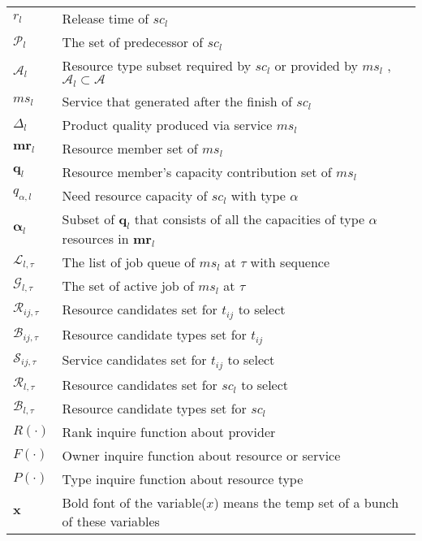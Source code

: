 \begin{table}[htbp]
\begin{tabularx}{\textwidth}{|lX|}
	$r_l$ & Release time of $sc_l$\\
	$\mathcal{P}_{l}$ & The set of predecessor of $sc_{l}$\\
	$\mathcal{A}_l$ & Resource type subset required by $sc_l$ or provided by $ms_l$ , $\mathcal{A}_l\subset\mathcal{A}$\\
	$ms_l$ & Service that generated after the finish of $sc_l$\\
	$\Delta_l$ & Product quality produced via service $ms_l$\\
	$\bm{mr}_l$ & Resource member set of $ms_l$\\
	$\bm{q}_l$ & Resource member's capacity contribution set of $ms_l$\\
	$q_{\alpha,l}$ & Need resource capacity of $sc_l$ with type $\alpha$\\
	$\bm{\alpha}_l$ & Subset of $\bm{q}_l$ that consists of all the capacities of type $\alpha$ resources in $\bm{mr}_l$\\
	$\mathcal{L}_{l,\tau}$ & The list of job queue of $ms_l$ at $\tau$ with sequence\\
	$\mathcal{G}_{l,\tau}$ & The set of active job of $ms_l$ at $\tau$ \\
	$\mathcal{R}_{ij,\tau}$ & Resource candidates set for $t_{ij}$ to select\\
	$\mathcal{B}_{ij,\tau}$ & Resource candidate types set for $t_{ij}$\\
	$\mathcal{S}_{ij,\tau}$ & Service candidates set for $t_{ij}$ to select\\
	$\mathcal{R}_{l,\tau}$ & Resource candidates set for $sc_l$ to select\\
	$\mathcal{B}_{l,\tau}$ & Resource candidate types set for $sc_l$\\
	$R(\cdot)$ & Rank inquire function about provider\\
	$F(\cdot)$ & Owner inquire function about resource or service\\
	$P(\cdot)$ & Type inquire function about resource type\\
	$\bm{x}$ & Bold font of the variable($x$) means the temp set of a bunch of these variables\\
    \hline
\end{tabularx}
\end{table}
\vspace{-2.5em}
